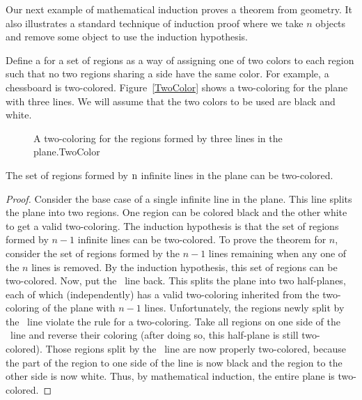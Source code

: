 Our next example of mathematical induction proves a theorem from
geometry.
It also illustrates a standard technique of induction proof where we
take \(n\) objects and remove some object to use the
induction hypothesis.

\begin{example}
Define a  for a
set of regions as a way of assigning one of two colors to each region
such that no two regions sharing a side have the same color.
For example, a chessboard is two-colored.
Figure~\ref{TwoColor} shows a two-coloring for the plane with three
lines.
We will assume that the two colors to be used are black and white.
\medskip

\begin{figure}

{A two-coloring for the regions formed by three lines in the
plane.}{TwoColor}
\smallskip
\end{figure}

\begin{theorem}
\label{ThmRegion}
The set of regions formed by \({\rm n}\) infinite lines in the plane
can be two-colored.
\end{theorem}

\begin{proof}
Consider the base case of a single infinite line in the plane.
This line splits the plane into two regions.
One region can be colored black and the other white to get a
valid two-coloring.
The induction hypothesis is that the set of regions formed by \(n-1\)
infinite lines can be two-colored.
To prove the theorem for \(n\), consider the set of regions formed by
the \(n-1\) lines remaining when any one of the \(n\) lines is removed.
By the induction hypothesis, this set of regions can be two-colored.
Now, put the \nth\ line back.
This splits the plane into two half-planes, each of which
(independently) has a valid two-coloring inherited from the
two-coloring of the plane with $n-1$ lines.
Unfortunately, the regions newly split by the \nth\ line violate the
rule for a two-coloring.
Take all regions on one side of the \nth\ line and reverse their
coloring (after doing so, this half-plane is still two-colored).
Those regions split by the \nth\ line are now properly two-colored,
because the part of the region to one side of the line is now black
and the region to the other side is now white.
Thus, by mathematical induction, the entire plane is
two-colored.
\end{proof}
\end{example}

